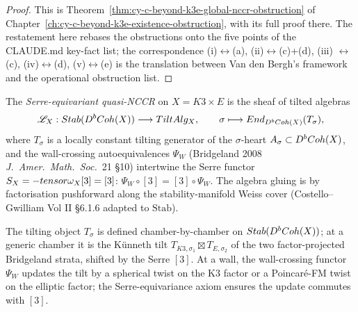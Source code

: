 \begin{proof}
This is Theorem~\ref{thm:cy-c-beyond-k3e-global-nccr-obstruction} of
Chapter~\ref{ch:cy-c-beyond-k3e-existence-obstruction}, with its full
proof there. The restatement here rebases the obstructions onto the
five points of the CLAUDE.md key-fact list; the correspondence
(i)$\leftrightarrow$(a), (ii)$\leftrightarrow$(c)+(d), (iii)
$\leftrightarrow$(c), (iv)$\leftrightarrow$(d), (v)$\leftrightarrow$(e)
is the translation between Van den Bergh's framework and the
operational obstruction list.
\end{proof}

\begin{definition}[Serre-equivariant quasi-NCCR on $X = K3 \times E$]
\label{gluing:def:serre-equivariant-quasi-nccr}
The \emph{Serre-equivariant quasi-NCCR} on $X = K3 \times E$ is the
sheaf of tilted algebras
\[
 \mathscr{L}_X : Stab(D^bCoh(X)) \longrightarrow
 TiltAlg_X,
 \qquad
 \sigma \longmapsto End_{D^bCoh(X)}(T_\sigma),
\]
where $T_\sigma$ is a locally constant tilting generator of the
$\sigma$-heart $A_\sigma \subset D^bCoh(X)$, and the wall-crossing
autoequivalences $\Psi_W$ (Bridgeland 2008 \emph{J.\ Amer.\ Math.\ Soc.}~21
\S 10) intertwine the Serre functor $S_X = - tensor \omega_X[3]
= [3]$: $\Psi_W \circ [3] = [3] \circ \Psi_W$. The algebra gluing is
by factorisation pushforward along the stability-manifold Weiss cover
(Costello--Gwilliam Vol II \S 6.1.6 adapted to $\mathrm{Stab}$).
\end{definition}

\begin{remark}
\label{gluing:rem:quasi-nccr-locally-defined}
The tilting object $T_\sigma$ is defined chamber-by-chamber on
$Stab(D^bCoh(X))$; at a generic chamber it is the
K\"unneth tilt $T_{K3, \sigma_1} \boxtimes T_{E, \sigma_2}$ of
the two factor-projected Bridgeland strata, shifted by the Serre
$[3]$. At a wall, the wall-crossing functor $\Psi_W$ updates the
tilt by a spherical twist on the K3 factor or a Poincar\'e-FM twist
on the elliptic factor; the Serre-equivariance axiom ensures the
update commutes with $[3]$.
\end{remark}

